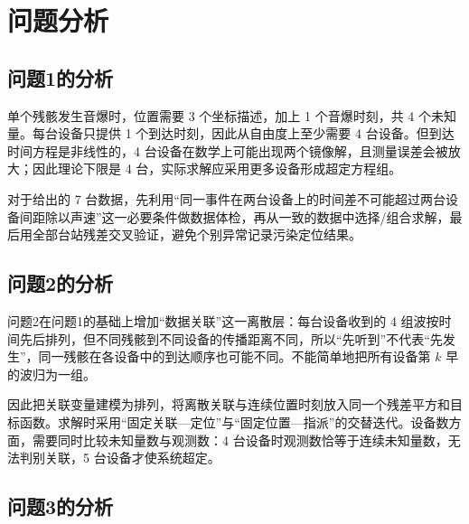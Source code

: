 \documentclass[12pt,a4paper]{article}
\newcommand{\tip}[1]{\par\noindent\textbf{【提示】} #1\par}
\newcommand{\warning}[1]{\par\noindent\textbf{【高频失分点】} #1\par}
\begin{document}

\section{问题分析}




\subsection{问题1的分析}

单个残骸发生音爆时，位置需要 3 个坐标描述，加上 1 个音爆时刻，共 4 个未知量。每台设备只提供 1 个到达时刻，因此从自由度上至少需要 4 台设备。但到达时间方程是非线性的，4 台设备在数学上可能出现两个镜像解，且测量误差会被放大；因此理论下限是 4 台，实际求解应采用更多设备形成超定方程组。

对于给出的 7 台数据，先利用“同一事件在两台设备上的时间差不可能超过两台设备间距除以声速”这一必要条件做数据体检，再从一致的数据中选择/组合求解，最后用全部台站残差交叉验证，避免个别异常记录污染定位结果。

\subsection{问题2的分析}

问题2在问题1的基础上增加“数据关联”这一离散层：每台设备收到的 4 组波按时间先后排列，但不同残骸到不同设备的传播距离不同，所以“先听到”不代表“先发生”，同一残骸在各设备中的到达顺序也可能不同。不能简单地把所有设备第 $k$ 早的波归为一组。

因此把关联变量建模为排列，将离散关联与连续位置时刻放入同一个残差平方和目标函数。求解时采用“固定关联—定位”与“固定位置—指派”的交替迭代。设备数方面，需要同时比较未知量数与观测数：4 台设备时观测数恰等于连续未知量数，无法判别关联，5 台设备才使系统超定。

\subsection{问题3的分析}
\end{document}
